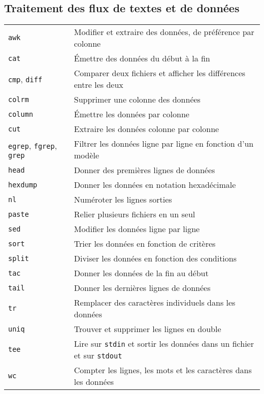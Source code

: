 \documentclass[10pt,a4paper]{article}
\begin{document}
\begin{multicols}{2}
\section{Traitement des flux de textes et de données}
\begin{tabular}{ p{2.5cm} p{8.5cm} }
  \hline
  \texttt{awk} & Modifier et extraire des données, de préférence par colonne \\
  \rowcolor{Gray}
  \texttt{cat} & Émettre des données du début à la fin\\
  \texttt{cmp}, \texttt{diff} & Comparer deux fichiers et afficher les différences entre les deux\\
  \rowcolor{Gray}
  \texttt{colrm} & Supprimer une colonne des données \\
  \texttt{column} & Émettre les données par colonne \\
  \rowcolor{Gray}
  \texttt{cut} &  Extraire les données colonne par colonne\\
  \texttt{egrep}, \texttt{fgrep}, \texttt{grep} & Filtrer les données ligne par ligne en fonction d'un modèle\\
  \rowcolor{Gray}
  \texttt{head} & Donner des premières lignes de données\\
  \texttt{hexdump} & Donner les données en notation hexadécimale\\
  \rowcolor{Gray}
  \texttt{nl} & Numéroter les lignes sorties \\
  \texttt{paste} & Relier plusieurs fichiers en un seul \\
  \rowcolor{Gray}
  \texttt{sed} & Modifier les données ligne par ligne \\
  \texttt{sort} & Trier les données en fonction de critères\\
  \rowcolor{Gray}
  \texttt{split} & Diviser les données en fonction des conditions \\
  \texttt{tac} & Donner les données de la fin au début\\
  \rowcolor{Gray}
  \texttt{tail} & Donner les dernières lignes de données\\
  \texttt{tr} & Remplacer des caractères individuels dans les données\\
  \rowcolor{Gray}
  \texttt{uniq} & Trouver et supprimer les lignes en double \\
  \texttt{tee} & Lire sur \texttt{stdin} et sortir les données dans un fichier et sur \texttt{stdout}\\
  \rowcolor{Gray}
  \texttt{wc} & Compter les lignes, les mots et les caractères dans les données\\
  \hline
\end{tabular}


\end{multicols}
\end{document}
